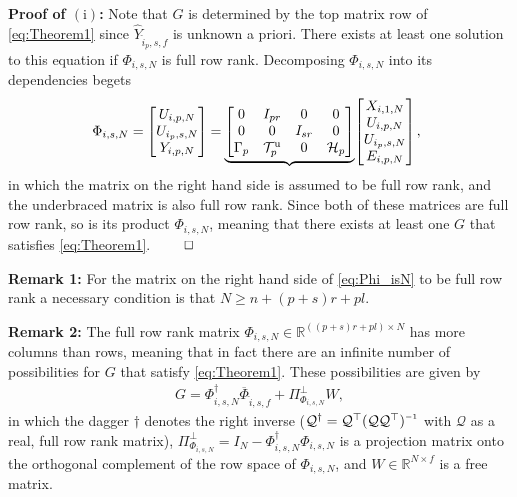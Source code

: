 \noindent\textbf{Proof of $(\mathrm{i})$:} Note that $G$ is determined by the top matrix row of \eqref{eq:Theorem1} since $\widehat{Y}_{\hat{i}_p,s,f}$ is unknown a priori. There exists at least one solution to this equation if $\Phi_{i,s,N}$ is full row rank. Decomposing $\Phi_{i,s,N}$ into its dependencies begets
\begin{align}\label{eq:Phi_isN}
    \mkern-8mu\Phi_{i,s,N}=\mkern-1mu\begin{bmatrix}
        U_{i,p,N}\\
        U_{i_p,s,N}\\
        Y_{i,p,N}
    \end{bmatrix}\mkern-1mu=\mkern-1mu
    \underbrace{\begin{bmatrix}
        0        & I_{pr} & 0      & 0\\
        0        & 0      & I_{sr} & 0\\
        \Gamma_p & \mathcal{T}_p^\mathrm{u} & 0 & \mathcal{H}_p
    \end{bmatrix}}\mkern-3mu\begin{bmatrix}
        X_{i,1,N}\\
        U_{i,p,N}\\
        U_{i_p,s,N}\\
        E_{i,p,N}
    \end{bmatrix}\mkern-1mu,
\end{align}
in which the matrix on the right hand side is assumed to be full row rank, and the underbraced matrix is also full row rank. Since both of these matrices are full row rank, so is its product $\Phi_{i,s,N}$, meaning that there exists at least one $G$ that satisfies \eqref{eq:Theorem1}. $\hfill\qed$

\noindent\textbf{Remark 1:} For the matrix on the right hand side of \eqref{eq:Phi_isN} to be full row rank a necessary condition is that $N\geq n+(p+s)r+pl$.

\noindent\textbf{Remark 2:} The full row rank matrix $\Phi_{i,s,N}\in\mathbb{R}^{((p+s)r+pl)\times N}$ has more columns than rows, meaning that in fact there are an infinite number of possibilities for $G$ that satisfy \eqref{eq:Theorem1}. These possibilities are given by
\begin{align}\label{eq:G_sols}
    G = \Phi_{i,s,N}^\dagger\overline{\Phi}_{\hat{i},s,f} + \Pi_{\Phi_{i,s,N}}^\bot W,
\end{align}
in which the dagger $\dagger$ denotes the right inverse ($\mathcal{Q}^\dagger=\mathcal{Q}^\top(\mathcal{Q}\mathcal{Q}^\top)\inv$ with $\mathcal{Q}$ as a real, full row rank matrix), $\Pi_{\Phi_{i,s,N}}^\bot=I_N-\Phi_{i,s,N}^\dagger\Phi_{i,s,N}$ is a projection matrix onto the orthogonal complement of the row space of $\Phi_{i,s,N}$, %
and $W\in\mathbb{R}^{N\times f}$ is a free matrix.

